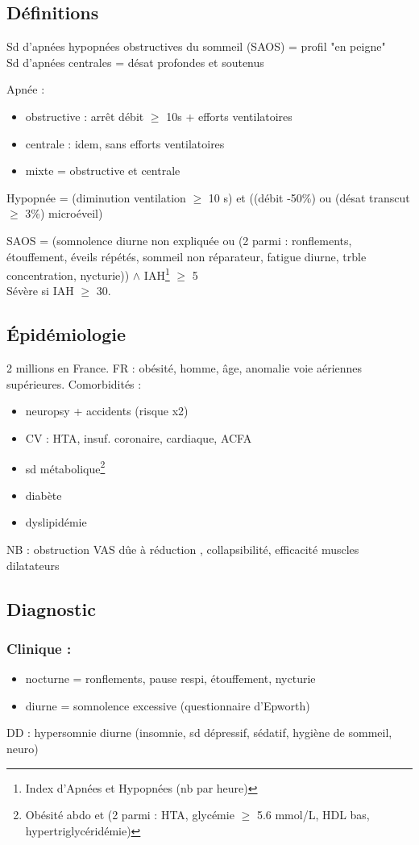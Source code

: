 \subsection{Définitions}
\danger Sd d'apnées hypopnées obstructives du sommeil (SAOS) = profil "en peigne"\\
Sd d'apnées centrales = désat profondes et soutenus

Apnée : 
\begin{itemize}
\item obstructive : arrêt débit \(\ge\) 10s + efforts ventilatoires
\item centrale : idem, sans efforts ventilatoires
\item mixte = obstructive et centrale
\end{itemize}
Hypopnée = (diminution ventilation \(\ge\) 10 s) et ((débit -50\%) ou (désat
transcut \(\ge\) 3\%) \textpm{} microéveil)

SAOS = (somnolence diurne non expliquée ou (2 parmi : ronflements, étouffement,
éveils répétés, sommeil non réparateur, fatigue diurne, trble concentration,
nycturie)) \(\wedge{}\)  IAH\footnote{Index d'Apnées et Hypopnées (nb par heure)} \(\ge\) 5\\
Sévère si IAH \(\ge\) 30.
\subsection{Épidémiologie}
2 millions en France.
FR : obésité, homme, âge, anomalie voie aériennes supérieures. 
Comorbidités :
\begin{itemize}
\item neuropsy + accidents (risque x2)
\item CV : HTA, insuf. coronaire, cardiaque, ACFA
\item sd métabolique\footnote{Obésité abdo et (2 parmi : HTA, glycémie \(\ge\) 5.6 mmol/L,
    HDL bas, hypertriglycéridémie)}
\item diabète
\item dyslipidémie
\end{itemize}

NB : obstruction \gls{VAS} dûe à {réduction \diameter, \nearrow{} collapsibilité,
  \searrow{} efficacité muscles dilatateurs}
\subsection{Diagnostic}
\subsubsection{Clinique :}
\begin{itemize}
\item nocturne = ronflements, pause respi, étouffement, nycturie
\item diurne = somnolence excessive (questionnaire d'Epworth)
\end{itemize}
DD : hypersomnie diurne (insomnie, sd dépressif, sédatif, hygiène de sommeil,
neuro)
